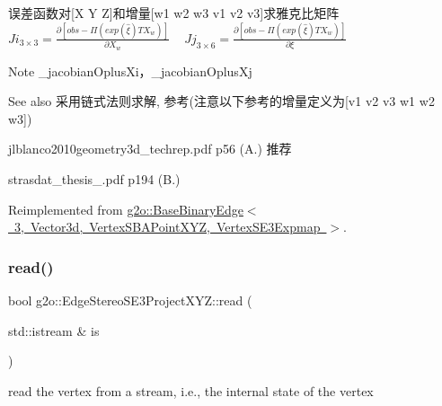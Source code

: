 误差函数对\mbox{[}X Y Z\mbox{]}和增量\mbox{[}w1 w2 w3 v1 v2 v3\mbox{]}求雅克比矩阵 ~\newline
 $Ji_{3\times3} = \frac{\partial [obs - \Pi(exp(\hat{\xi}) T X_w)]}{\partial X_w} $ ~\newline
 $Jj_{3\times6} = \frac{\partial [obs - \Pi(exp(\hat{\xi}) T X_w)]}{\partial \xi} $ ~\newline
\begin{DoxyNote}{Note}
\+\_\+jacobian\+Oplus\+Xi，\+\_\+jacobian\+Oplus\+Xj 
\end{DoxyNote}
\begin{DoxySeeAlso}{See also}
采用链式法则求解, 参考(注意以下参考的增量定义为\mbox{[}v1 v2 v3 w1 w2 w3\mbox{]})
\begin{DoxyItemize}
\item jlblanco2010geometry3d\+\_\+techrep.\+pdf p56 (A.) 推荐
\item strasdat\+\_\+thesis\+\_.\+pdf p194 (B.) 
\end{DoxyItemize}
\end{DoxySeeAlso}


Reimplemented from \mbox{\hyperlink{classg2o_1_1_base_binary_edge_af0fb8a693c8c7996fa65566e7263fbc4}{g2o\+::\+Base\+Binary\+Edge$<$ 3, Vector3d, Vertex\+S\+B\+A\+Point\+X\+Y\+Z, Vertex\+S\+E3\+Expmap $>$}}.

\mbox{\label{classg2o_1_1_edge_stereo_s_e3_project_x_y_z_a59cdc820a694379a73a26d51d948db0e}} 
\subsubsection{\texorpdfstring{read()}{read()}}
{\footnotesize\ttfamily bool g2o\+::\+Edge\+Stereo\+S\+E3\+Project\+X\+Y\+Z\+::read (\begin{DoxyParamCaption}\item[{std\+::istream \&}]{is }\end{DoxyParamCaption})\hspace{0.3cm}{\ttfamily [virtual]}}



read the vertex from a stream, i.\+e., the internal state of the vertex 



